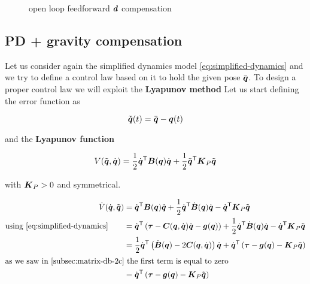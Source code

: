 \begin{figure}[htb]
{
	}
	\caption{open loop feedforward $\boldsymbol{d}$ compensation}
	\label{fig:open-loop}
\end{figure}

\subsection{PD + gravity compensation}

Let us consider again the simplified dynamics model \autoref{eq:simplified-dynamics} and we try to define a control law based on it to hold the given pose $\bar {\boldsymbol{q}}$.
To design a proper control law we will exploit the \textbf{Lyapunov method}
Let us start defining the error function as

\[
	\tilde{\boldsymbol{q}}(t) = \bar {\boldsymbol{q}} - \boldsymbol{q}(t)
\]

and the \textbf{Lyapunov function}

\[
	V(\tilde{\boldsymbol{q}}, \dot{\boldsymbol{q}}) = \frac{1}{2} \dot{\boldsymbol{q}}^{\mathsf{T}} \boldsymbol{B}(\boldsymbol{q}) \dot{\boldsymbol{q}} + \frac{1}{2} \tilde{\boldsymbol{q}}^{\mathsf{T}} \boldsymbol{K}_P \tilde{\boldsymbol{q}}
\]

with $\boldsymbol{K}_P > 0$ and symmetrical.

\begin{align*}
    \dot V(\dq, \tilde\q) &= \dq^\trans \matr B(\q) \ddq + \frac{1}{2} \dq^\trans \dot{\matr B}(\q) \dq - \dq^\trans \matr K_P \tilde \q \\
	\text{using \ref{eq:simplified-dynamics}}\qquad
    &= \dq^\trans \left( \vect \tau - \matr C(\q,\dq)\dq -\vect g(\q) \right) + \frac{1}{2} \dq^\trans \dot{\matr B}(\q) \dq - \dq^\trans \matr K_P \tilde \q \\
	&= \frac{1}{2} \dq^\trans \left( \dot{\matr B}(\q) - 2\matr C(\q,\dq) \right) \dq + \dq^\trans \left( \vect \tau -\vect g(\q) - \matr K_P \tilde \q \right) \\
	\intertext{as we saw in \autoref{subsec:matrix-db-2c} the first term is equal to zero}
    &= \dq^\trans \left( \vect \tau -\vect g(\q) - \matr K_P \tilde \q \right)
\end{align*}

